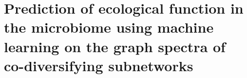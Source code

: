 

\chapter{Prediction of ecological function in the microbiome using machine learning on the graph spectra of co-diversifying subnetworks}
















